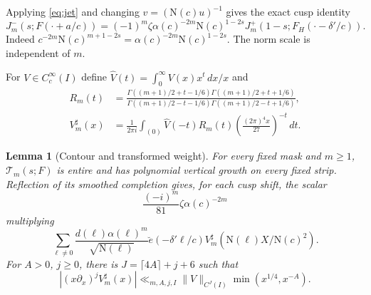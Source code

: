 \documentclass[11pt,a4paper]{article}
\numberwithin{equation}{section}
\newtheorem{lemma}[theorem]{Lemma}
\theoremstyle{definition}
\theoremstyle{remark}
\newcommand{\N}{\mathrm N}
\newcommand{\dd}{\,d}
\newcommand{\wt}{\widehat}
\newcommand{\ve}{\breve e}
\begin{document}
Applying \eqref{eq:jet} and changing $v=(\N(c)u)^{-1}$ gives the exact cusp identity
\begin{equation}\label{eq:MellinFE}
 J_m^-(s;F(\cdot+a/c))=(-1)^m\zeta\alpha(c)^{-2m}\N(c)^{1-2s}
 J_m^+(1-s;F_H(\cdot-\delta'/c)).
\end{equation}
Indeed $c^{-2m}\N(c)^{m+1-2s}=\alpha(c)^{-2m}\N(c)^{1-2s}$. The norm scale is independent of $m$.

For $V\in C_c^\infty(I)$ define $\wt V(t)=\int_0^\infty V(x)x^t\dd x/x$ and
\begin{align}\label{eq:Rm}
 R_m(t)&=\frac{\Gamma((m+1)/2+t-1/6)\Gamma((m+1)/2+t+1/6)}
 {\Gamma((m+1)/2-t-1/6)\Gamma((m+1)/2-t+1/6)},\\
 V_m^\sharp(x)&=\frac1{2\pi i}\int_{(0)}\wt V(-t)R_m(t)
 \left(\frac{(2\pi)^4x}{27}\right)^{-t}\dd t.\label{eq:kernel}
\end{align}
\begin{lemma}[Contour and transformed weight]\label{lem:contour}
For every fixed mask and $m\ge1$, $\mathcal T_m(s;F)$ is entire and has polynomial vertical growth on every fixed strip. Reflection of its smoothed completion gives, for each cusp shift, the scalar
\begin{equation}\label{eq:scalar}
 \frac{(-i)^m}{81}\zeta\alpha(c)^{-2m}
\end{equation}
multiplying
\[
 \sum_{\ell\ne0}\frac{d(\ell)\alpha(\ell)^m}{\sqrt{\N(\ell)}}
 \ve(-\delta'\ell/c)V_m^\sharp(\N(\ell)X/\N(c)^2).
\]
For $A>0$, $j\ge0$, there is $J=\lceil4A\rceil+j+6$ such that
\begin{equation}\label{eq:kernelbound}
 |(x\partial_x)^jV_m^\sharp(x)|\ll_{m,A,j,I}\|V\|_{C^J(I)}\min(x^{1/4},x^{-A}).
\end{equation}
\end{lemma}
\end{document}
